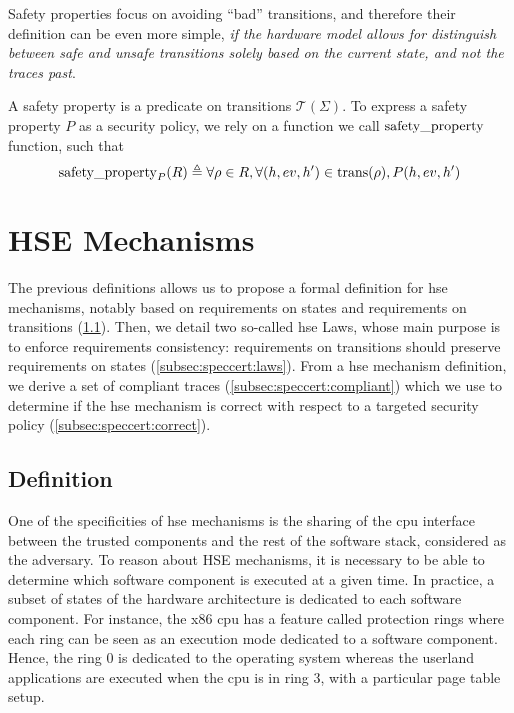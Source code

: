 Safety properties focus on avoiding ``bad'' transitions, and therefore their
definition can be even more simple, \emph{if the hardware model allows for
  distinguish between safe and unsafe transitions solely based on the current
  state, and not the traces past}.

\begin{definition}
  \label{def:speccert:safetyprop}
  A safety property is a predicate on transitions $\mathcal{T}(\Sigma)$.
  To express a safety property $P$ as a security policy, we rely on a function
  we call $\mathrm{safety\_property}$ function, such that
  \[
    \mathrm{safety\_property}_{P}(R) \triangleq \forall \rho \in R, \forall (h,
    ev, h') \in \mathrm{trans}(\rho), P(h, ev, h')
  \]
\end{definition}

\section{HSE Mechanisms}
\label{sec:speccert:hse}

The previous definitions allows us to propose a formal definition for \ac{hse}
mechanisms, notably based on requirements on states and requirements on
transitions (\ref{subsec:speccert:hsedef}).
%
Then, we detail two so-called \ac{hse} Laws, whose main purpose is to enforce
requirements consistency: requirements on transitions should preserve
requirements on states (\ref{subsec:speccert:laws}).
%
From a \ac{hse} mechanism definition, we derive a set of compliant traces
(\ref{subsec:speccert:compliant}) which we use to determine if the \ac{hse}
mechanism is correct with respect to a targeted security policy
(\ref{subsec:speccert:correct}).

\subsection{Definition}
\label{subsec:speccert:hsedef}

One of the specificities of \ac{hse} mechanisms is the sharing of the \ac{cpu}
interface between the trusted components and the rest of the software stack,
considered as the adversary.
%
To reason about HSE mechanisms, it is necessary to be able to determine which
software component is executed at a given time.
%
In practice, a subset of states of the hardware architecture is dedicated to
each software component.
%
For instance, the x86 \ac{cpu} has a feature called protection rings where each
ring can be seen as an execution mode dedicated to a software component.
%
Hence, the ring 0 is dedicated to the operating system whereas the userland
applications are executed when the \ac{cpu} is in ring 3, with a particular page
table setup.

